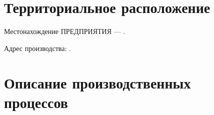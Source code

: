 \section{Территориальное расположение}
%

Местонахождение ПРЕДПРИЯТИЯ --- \CURADDRESS.

Адрес производства:
\ADDRESS.



\newpage
\section{Описание производственных процессов}

















 












